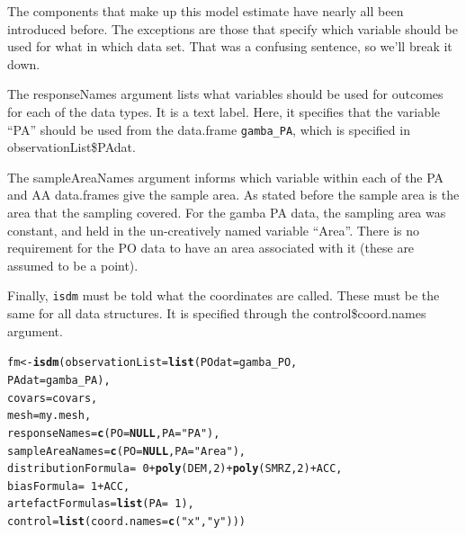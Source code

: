 \documentclass[article,shortnames,nojss]{jss}\usepackage[]{graphicx}\usepackage[]{xcolor}
\makeatletter
\newcommand{\hlnum}[1]{\textcolor[rgb]{0.686,0.059,0.569}{#1}}%
\newcommand{\hlstr}[1]{\textcolor[rgb]{0.192,0.494,0.8}{#1}}%
\newcommand{\hlopt}[1]{\textcolor[rgb]{0,0,0}{#1}}%
\newcommand{\hlstd}[1]{\textcolor[rgb]{0.345,0.345,0.345}{#1}}%
\newcommand{\hlkwa}[1]{\textcolor[rgb]{0.161,0.373,0.58}{\textbf{#1}}}%
\newcommand{\hlkwb}[1]{\textcolor[rgb]{0.69,0.353,0.396}{#1}}%
\newcommand{\hlkwc}[1]{\textcolor[rgb]{0.333,0.667,0.333}{#1}}%
\newcommand{\hlkwd}[1]{\textcolor[rgb]{0.737,0.353,0.396}{\textbf{#1}}}%
\newenvironment{kframe}{%
 \def\at@end@of@kframe{}%
 \ifinner\ifhmode%
  \def\at@end@of@kframe{\end{minipage}}%
  \begin{minipage}{\columnwidth}%
 \fi\fi%
 \def\FrameCommand##1{\hskip\@totalleftmargin \hskip-\fboxsep
 \colorbox{shadecolor}{##1}\hskip-\fboxsep
     \hskip-\linewidth \hskip-\@totalleftmargin \hskip\columnwidth}%
 \MakeFramed {\advance\hsize-\width
   \@totalleftmargin\z@ \linewidth\hsize
   \@setminipage}}%
 {\par\unskip\endMakeFramed%
 \at@end@of@kframe}
\newenvironment{knitrout}{}{} %
\makeatother
\begin{document}
The components that make up this model estimate have nearly all been introduced before. The exceptions are those that specify which variable should be used for what in which data set. That was a confusing sentence, so we'll break it down.
  
The responseNames argument lists what variables should be used for outcomes for each of the data types. It is a text label. Here, it specifies that the variable ``PA'' should be used from the data.frame \texttt{gamba\_PA}, which is specified in observationList\$PAdat.
  
The sampleAreaNames argument informs which variable within each of the PA and AA data.frames give the sample area. As stated before the sample area is the area that the sampling covered. For the gamba PA data, the sampling area was constant, and held in the un-creatively named variable ``Area''. There is no requirement for the PO data to have an area associated with it (these are assumed to be a point).
  
Finally, \texttt{isdm} must be told what the coordinates are called. These must be the same for all data structures. It is specified through the control\$coord.names argument.
  
\begin{knitrout}
\color{fgcolor}\begin{kframe}
\begin{alltt}
\hlstd{fm} \hlkwb{<-} \hlkwd{isdm}\hlstd{(} \hlkwc{observationList}\hlstd{=}\hlkwd{list}\hlstd{(} \hlkwc{POdat}\hlstd{=gamba_PO,}
                                  \hlkwc{PAdat}\hlstd{=gamba_PA),}
            \hlkwc{covars}\hlstd{=covars,}
            \hlkwc{mesh}\hlstd{=my.mesh,}
            \hlkwc{responseNames}\hlstd{=}\hlkwd{c}\hlstd{(} \hlkwc{PO}\hlstd{=}\hlkwa{NULL}\hlstd{,} \hlkwc{PA}\hlstd{=}\hlstr{"PA"}\hlstd{),}
            \hlkwc{sampleAreaNames}\hlstd{=}\hlkwd{c}\hlstd{(} \hlkwc{PO}\hlstd{=}\hlkwa{NULL}\hlstd{,} \hlkwc{PA}\hlstd{=}\hlstr{"Area"}\hlstd{),}
            \hlkwc{distributionFormula}\hlstd{=}\hlopt{~}\hlnum{0}\hlopt{+}\hlkwd{poly}\hlstd{( DEM,} \hlnum{2}\hlstd{)} \hlopt{+} \hlkwd{poly}\hlstd{( SMRZ,}\hlnum{2}\hlstd{)} \hlopt{+} \hlstd{ACC,}
            \hlkwc{biasFormula}\hlstd{=}\hlopt{~}\hlnum{1}\hlopt{+}\hlstd{ACC,}
            \hlkwc{artefactFormulas}\hlstd{=}\hlkwd{list}\hlstd{(} \hlkwc{PA}\hlstd{=}\hlopt{~}\hlnum{1}\hlstd{),}
            \hlkwc{control}\hlstd{=}\hlkwd{list}\hlstd{(} \hlkwc{coord.names}\hlstd{=}\hlkwd{c}\hlstd{(}\hlstr{"x"}\hlstd{,}\hlstr{"y"}\hlstd{)))}
\end{alltt}
\end{kframe}
\end{knitrout}
    
\end{document}

